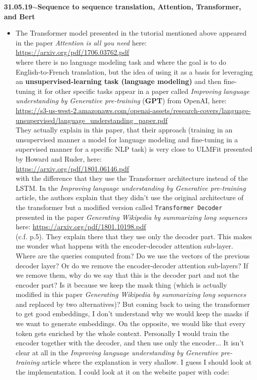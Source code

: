 \documentclass[11pt,a4paper]{article}
\newenvironment{loggentry}[2]%
{\noindent\textbf{#1}\hspace{1cm}$\mathbf{\sim}$\text{ }\textbf{#2}\\}{\vspace{0.5cm}}
\begin{document}
\begin{loggentry}{31.05.19}{Sequence to sequence translation, Attention, Transformer, and Bert}
\begin{itemize}
\item The Transformer model presented in the tutorial mentioned above appeared in the paper \textit{Attention is all you need} here:\\
\url{https://arxiv.org/pdf/1706.03762.pdf}\\
where there is no language modeling task and where the goal is to do English-to-French translation, but the idea of using it as a basis for leveraging an \textbf{unsupervised-learning task (language modeling)} and then fine-tuning it for other specific tasks appear in a paper called \textit{Improving language understanding by Generative pre-training} (\textbf{GPT}) from OpenAI, here:\\
\url{https://s3-us-west-2.amazonaws.com/openai-assets/research-covers/language-unsupervised/language_understanding_paper.pdf}\\
They actually explain in this paper, that their approach (training in an unsupervised manner a model for language modeling and fine-tuning in a supervised manner for a specific NLP task) is very close to ULMFit presented by Howard and Ruder, here:\\
\url{https://arxiv.org/pdf/1801.06146.pdf}\\
with the difference that they use the Transformer architecture instead of the LSTM. In the \textit{Improving language understanding by Generative pre-training} article, the authors explain that they didn't use the original architecture of the transformer but a modified version called \texttt{Transformer Decoder} presented in the paper \textit{Generating Wikipedia by summarizing long sequences} here:
\url{https://arxiv.org/pdf/1801.10198.pdf}\\
(c.f. p.5). They explain there that they use only the decoder part. This makes me wonder what happens with the encoder-decoder attention sub-layer. Where are the queries computed from? Do we use the vectors of the previous decoder layer? Or do we remove the encoder-decoder attention sub-layers? If we remove them, why do we  say that this is the decoder part and not the encoder part? Is it because we keep the mask thing (which is actually modified in this paper \textit{Generating Wikipedia by summarizing long sequences} and replaced by two alternatives)? But coming back to using the transformer to get good embeddings, I don't understand why we would keep the masks if we want to generate embeddings. On the opposite, we would like that every token gets enriched by the whole context. Personally I would train the encoder together with the decoder, and then use only the encoder... It isn't clear at all in the \textit{Improving language understanding by Generative pre-training} article where the explanation is very shallow. I guess I should look at the implementation. I could look at it on the website paper with code:\\

\end{itemize}
\end{loggentry}
\end{document}
